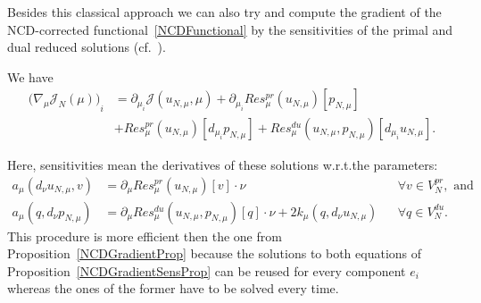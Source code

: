 Besides this classical approach we can also try and compute the gradient of the NCD-corrected functional~\eqref{NCDFunctional} by the sensitivities of the primal and dual reduced solutions (cf.~\cite[Proposition 3.9]{Keil2021}).
\begin{proposition}\label{NCDGradientSensProp}
    We have
    \begin{align*}\label{NCDGradientSens}
        {\big( \nabla_\mu \mathcal{J}_N(\mu) \big)}_i &= \partial_{\mu_i} \mathcal{J}(u_{N, \mu}, \mu) + \partial_{\mu_i} Res_\mu^{pr}(u_{N, \mu})[p_{N, \mu}] \\
        &+ Res_\mu^{pr}(u_{N, \mu})[d_{\mu_i} p_{N, \mu}] + Res_\mu^{du}(u_{N, \mu}, p_{N, \mu})[d_{\mu_i} u_{N, \mu}].
    \end{align*}
\end{proposition}
Here, sensitivities mean the derivatives of these solutions w.r.t.\@ the parameters:
\begin{align*}
    a_\mu(d_\nu u_{N, \mu}, v) &= \partial_\mu Res_\mu^{pr}(u_{N, \mu})[v] \cdot \nu &&\forall v \in V_N^{pr}, \text{ and} \\
    a_\mu(q, d_\nu p_{N, \mu}) &= \partial_\mu Res_\mu^{du}(u_{N, \mu}, p_{N, \mu})[q] \cdot \nu + 2 k_\mu(q, d_\nu u_{N, \mu}) &&\forall q \in V_N^{du}.
\end{align*}
This procedure is more efficient then the one from Proposition~\ref{NCDGradientProp} because the solutions to both equations of Proposition~\ref{NCDGradientSensProp} can be reused for every component $e_i$ whereas the ones of the former have to be solved every time.

